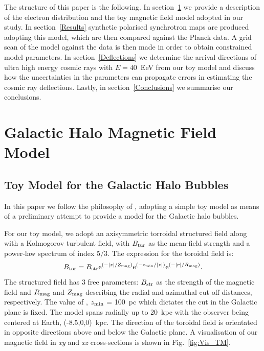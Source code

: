 \documentclass[usenatbib]{mnras}
\begin{document}
The structure of this paper is the following. In section~\ref{Methods} we provide a description of the electron distribution and the toy magnetic field model adopted in our study. In section~\ref{Results} synthetic polarised synchrotron maps are produced adopting this model, which are then compared against the Planck data. A grid scan of the model against the data is then made in order to obtain constrained model parameters. In section~\ref{Deflections} we determine the arrival directions of ultra high energy cosmic rays with $E = 40$~EeV from our toy model and discuss how the uncertainties in the parameters can propagate errors in estimating the cosmic ray deflections. 
Lastly, in section~\ref{Conclusions} we summarise our conclusions.

\section{Galactic Halo Magnetic Field Model}
\label{Methods}

\subsection{Toy Model for the Galactic Halo Bubbles}
\label{GMF}
In this paper we follow the philosophy of \cite{West_Helicity}, adopting a simple toy model as means of a preliminary attempt to provide a model for the Galactic halo bubbles. 

For our toy model, we adopt an axisymmetric torroidal structured field along with a Kolmogorov turbulent field, with $B_{\rm{tur}}$ as the mean-field strength and a power-law spectrum of index $5/3$. The expression for the toroidal field is:
\begin{equation}\label{TM_equation}
B_{\rm{tor}} = B_{\rm{str}} {\rm{e}}^{(-|z|/Z_{\rm{mag}})} {\rm{e}}^{(-z_{\rm{min}}/|z|)} {\rm{e}}^{(-|r|/R_{\rm{mag}})}.
\end{equation}
The structured field has 3 free parameters: $B_{\rm str}$ as the strength of the magnetic field and $R_{\rm {mag}}$ and $Z_{\rm {mag}}$ describing the radial and azimuthal cut off distances, respectively. The value of , $z_{\rm min}$ = 100~pc which dictates the cut in the Galactic plane is fixed. The model spans radially up to 20~kpc with the observer being centered at Earth, (-8.5,0,0)~kpc. The direction of the toroidal field is orientated in opposite directions above and below the Galactic plane. A visualisation of our magnetic field in \textit{xy} and \textit{xz} cross-sections is shown in Fig.~\ref{fig:Vis_TM}. 
\end{document}
